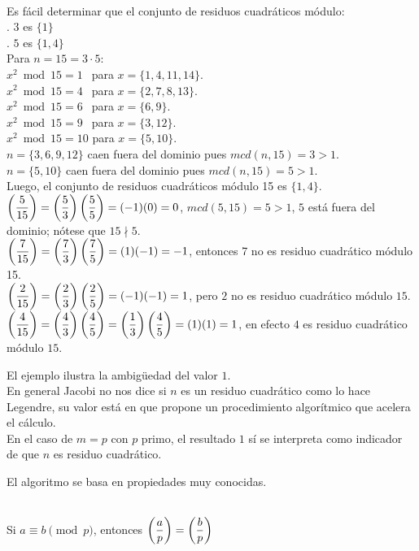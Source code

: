 \begin{ejemplo} \, \\
Es fácil determinar que el conjunto de residuos cuadráticos módulo: \\
. $3$ es $\{1\}$ \\
. $5$ es $\{1,4\}$ \\
Para $n = 15 = 3 \cdot 5$: \\
$x^2 \bmod 15 = 1 \,\;$ para $x=\{1,4,11,14\}$. \\
$x^2 \bmod 15 = 4 \,\;$ para $x=\{2,7,8,13\}$. \\
$x^2 \bmod 15 = 6 \,\;$ para $x=\{6,9\}$. \\
$x^2 \bmod 15 = 9 \,\;$ para $x=\{3,12\}$. \\
$x^2 \bmod 15 = 10$ para $x=\{5,10\}$. \\
$n=\{3,6,9,12\}$ caen fuera del dominio pues $mcd(n,15)=3>1$. \\
$n=\{5,10\}$ caen fuera del dominio pues $mcd(n,15)=5>1$. \\
Luego, el conjunto de residuos cuadráticos módulo 15 es $\{1, 4\}$. \\ 
$\left(\dfrac{5}{15}\right) = \left(\dfrac{5}{3}\right) \left(\dfrac{5}{5}\right) = (-1)(0) = 0$, $mcd(5,15)=5>1$, $5$ está fuera del dominio; nótese que $15 \nmid 5$. \\
$\left(\dfrac{7}{15}\right) = \left(\dfrac{7}{3}\right) \left(\dfrac{7}{5}\right) = (1)(-1) = -1$, entonces 7 no es residuo cuadrático módulo 15.\\
$\left(\dfrac{2}{15}\right) = \left(\dfrac{2}{3}\right) \left(\dfrac{2}{5}\right) = (-1)(-1) = 1$, pero $2$ no es residuo cuadrático módulo $15$. \\
$\left(\dfrac{4}{15}\right) = \left(\dfrac{4}{3}\right) \left(\dfrac{4}{5}\right) = \left(\dfrac{1}{3}\right) \left(\dfrac{4}{5}\right) = (1)(1) = 1$, en efecto $4$ es residuo cuadrático módulo $15$.
\end{ejemplo}

El ejemplo ilustra la ambigüedad del valor $1$.  \\

En general Jacobi no nos dice si $n$ es un residuo cuadrático como lo hace Legendre, su valor está en que propone un procedimiento algorítmico que acelera el cálculo. \\
En el caso de $m=p$ con $p$ primo, el resultado $1$ sí se interpreta como indicador de que $n$ es residuo cuadrático.

El algoritmo se basa en propiedades muy conocidas. 

\begin{enunciado} \, \\
Si $a \equiv b \pmod {p}$, entonces $\left(\dfrac{a}{p}\right) = \left(\dfrac{b}{p}\right)$
\end{enunciado}

